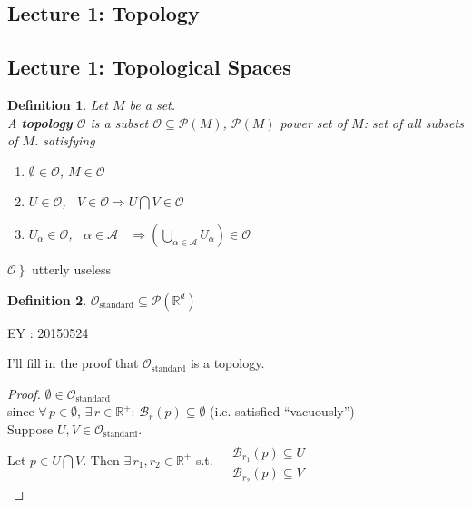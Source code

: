 \documentclass[10pt, twoside]{amsart}
\newtheorem{definition}{Definition}
\begin{document}
\begin{multicols*}{2}
\section{Lecture 1: Topology}

\subsection{Lecture 1: Topological Spaces}

\begin{definition}
  Let $M$ be a set.  \\
A \textbf{topology} $\mathcal{O}$ is a subset $\mathcal{O} \subseteq \mathcal{P}(M)$, $\mathcal{P}(M)$ power set of $M$: set of all subsets of $M$. satisfying
\begin{enumerate}
  \item[(i)] $\emptyset \in \mathcal{O}$, $M \in \mathcal{O}$ 
\item[(ii)] $ U \in \mathcal{O}$, \, $V \in \mathcal{O} \Longrightarrow U\bigcap V \in \mathcal{O}$ 
\item[(iii)] $U_{\alpha} \in \mathcal{O}$, \, $\alpha \in \mathcal{A}$ \, $\Longrightarrow \left( \bigcup_{\alpha \in \mathcal{A}} U_{\alpha} \right) \in \mathcal{O}$
\end{enumerate}
\end{definition}

$ \left. \mathcal{O} \right\} $ utterly useless

\begin{definition}
  $\mathcal{O}_{\text{standard}} \subseteq \mathcal{P}(\mathbb{R}^d)$
\end{definition}

EY : 20150524 

I'll fill in the proof that $\mathcal{O}_{\text{standard}}$ is a topology.  

\begin{proof}
  $\emptyset \in \mathcal{O}_{\text{standard}}$ \\
since $\forall \, p \in \emptyset$, $\exists \, r \in \mathbb{R}^+$: $\mathcal{B}_r(p) \subseteq \emptyset$ (i.e. satisfied ``vacuously'') \\

Suppose $U,V \in \mathcal{O}_{\text{standard}}$.  \\
Let $p \in U \bigcap V$.  Then $\exists \, r_1, r_2 \in \mathbb{R}^+$ s.t. $\begin{aligned} & \quad \\
  & \mathcal{B}_{r_1}(p) \subseteq U \\
  & \mathcal{B}_{r_2}(p) \subseteq V \end{aligned}$ \\


\end{proof}
\end{multicols*}
\end{document}
